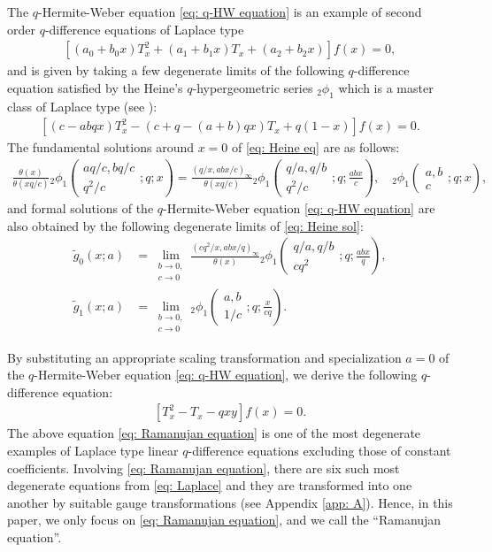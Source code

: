 \documentclass[a4paper]{article}
\newcommand{\hyper}[4]{\left( \begin{matrix} #1 \\ #2 \end{matrix};#3;#4\right)}
\numberwithin{equation}{section}
\theoremstyle{plain}
\begin{document}
The $q$-Hermite-Weber equation \eqref{eq: q-HW equation} is an example of second order $q$-difference equations of Laplace type
\begin{align}
\label{eq: Laplace}
[(a_0+b_0x)T_x^2+(a_1+b_1x)T_x+(a_2+b_2x)]f(x)=0, 
\end{align}
and is given by taking a few degenerate limits of the following $q$-difference equation satisfied by the Heine's $q$-hypergeometric series ${}_2\phi_1$ which is a master class of Laplace type (see \cite[Figure 2]{O}): 
\begin{align}
\label{eq: Heine eq}
[(c-abqx)T_x^2-(c+q-(a+b)qx)T_x+q(1-x)]f(x)=0. 
\end{align}
The fundamental solutions around $x=0$ of \eqref{eq: Heine eq} are as follows:  
\begin{align}
\label{eq: Heine sol}
\frac{\theta(x)}{\theta(xq/c)}{}_2\phi_1\hyper{aq/c,bq/c}{q^2/c}{q}{x}=\frac{(q/x,abx/c)_\infty}{\theta(x q/c)}{}_2\phi_1\hyper{q/a,q/b}{q^2/c}{q}{\frac{abx}{c}},\quad {}_2\phi_1\hyper{a,b}{c}{q}{x}, 
\end{align}
and formal solutions of the $q$-Hermite-Weber equation \eqref{eq: q-HW equation} are also obtained by the following degenerate limits of \eqref{eq: Heine sol}: 
\begin{align}
\label{eq: convergent solution of q-HW}
\widetilde{g}_0(x;a)
  &=
  \lim_{\substack{b\to0, \\c\to0}}\frac{(cq^2/x,abx/q)_\infty}{\theta(x)}{}_2\phi_1\hyper{q/a,q/b}{c q^2}{q}{\frac{abx}{q}}
  , \\
\label{eq: divergent solution of q-HW}
 \widetilde{g}_1(x;a)
  &=
  \lim_{\substack{b\to0, \\c\to0}}{}_2\phi_1\hyper{a,b}{1/c}{q}{\frac{x}{cq}}. 
\end{align}

By substituting an appropriate scaling transformation and specialization $a=0$ of the $q$-Hermite-Weber equation \eqref{eq: q-HW equation}, we derive the following $q$-difference equation: 
\begin{align}
\label{eq: Ramanujan equation}
\left[T_{x}^{2} - T_{x} - qxy \right]f(x)=0. 
\end{align}
The above equation \eqref{eq: Ramanujan equation} is one of the most degenerate examples of Laplace type linear $q$-difference equations excluding those of constant coefficients. 
Involving \eqref{eq: Ramanujan equation}, there are six such most degenerate equations from \eqref{eq: Laplace} and they are transformed into one another by suitable gauge transformations (see Appendix \ref{app: A}). 
Hence, in this paper, we only focus on \eqref{eq: Ramanujan equation}, and we call the ``Ramanujan equation''. 
\end{document}
